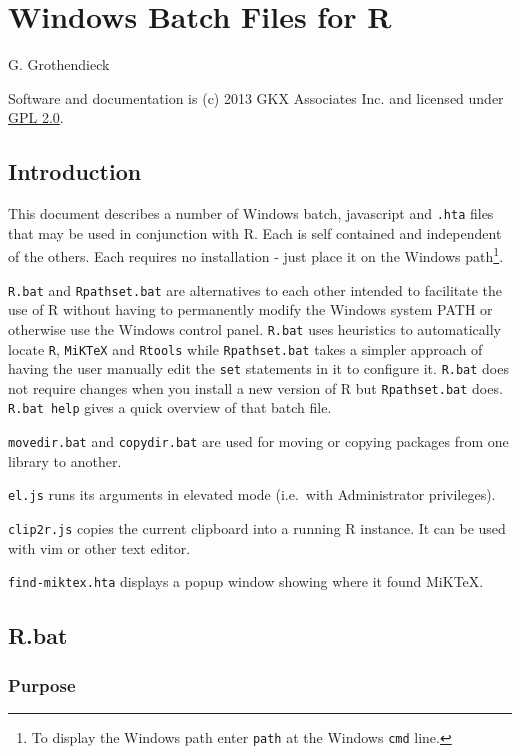 \section{Windows Batch Files for R}

G. Grothendieck

Software and documentation is (c) 2013 GKX Associates Inc. and licensed
under \href{https://www.gnu.org/licenses/gpl-2.0.html}{GPL 2.0}.

\subsection{Introduction}

This document describes a number of Windows batch, javascript and
\texttt{.hta} files that may be used in conjunction with R. Each is self
contained and independent of the others. Each requires no installation -
just place it on the Windows path\footnote{To display the Windows path
  enter \texttt{path} at the Windows \texttt{cmd} line.}.

\texttt{R.bat} and \texttt{Rpathset.bat} are alternatives to each other
intended to facilitate the use of R without having to permanently modify
the Windows system PATH or otherwise use the Windows control panel.
\texttt{R.bat} uses heuristics to automatically locate \texttt{R},
\texttt{MiKTeX} and \texttt{Rtools} while \texttt{Rpathset.bat} takes a
simpler approach of having the user manually edit the \texttt{set}
statements in it to configure it. \texttt{R.bat} does not require
changes when you install a new version of R but \texttt{Rpathset.bat}
does. \texttt{R.bat help} gives a quick overview of that batch file.

\texttt{movedir.bat} and \texttt{copydir.bat} are used for moving or
copying packages from one library to another.

\texttt{el.js} runs its arguments in elevated mode (i.e.~with
Administrator privileges).

\texttt{clip2r.js} copies the current clipboard into a running R
instance. It can be used with vim or other text editor.

\texttt{find-miktex.hta} displays a popup window showing where it found
MiKTeX.

\subsection{R.bat}

\subsubsection{Purpose}

